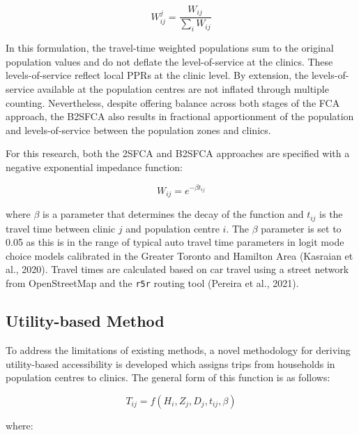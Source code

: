 \documentclass[]{elsarticle} %
\begin{document}
\begin{equation}
\label{eq:bfca_W_ij_j}
W_{ij}^{j} = \frac{W_{ij}}{\sum_i W_{ij}}
\end{equation}

In this formulation, the travel-time weighted populations sum to the
original population values and do not deflate the level-of-service at
the clinics. These levels-of-service reflect local PPRs at the clinic
level. By extension, the levels-of-service available at the population
centres are not inflated through multiple counting. Nevertheless,
despite offering balance across both stages of the FCA approach, the
B2SFCA also results in fractional apportionment of the population and
levels-of-service between the population zones and clinics.

For this research, both the 2SFCA and B2SFCA approaches are specified
with a negative exponential impedance function:

\begin{equation}
\label{eq:W_ij}
W_{ij} = e^{-\beta t_{ij}}
\end{equation}

\noindent where \(\beta\) is a parameter that determines the decay of
the function and \(t_{ij}\) is the travel time between clinic \(j\) and
population centre \(i\). The \(\beta\) parameter is set to 0.05 as this
is in the range of typical auto travel time parameters in logit mode
choice models calibrated in the Greater Toronto and Hamilton Area
(Kasraian et al., 2020). Travel times are calculated based on car travel
using a street network from OpenStreetMap and the \texttt{r5r} routing
tool (Pereira et al., 2021).

\hypertarget{utility-based-method}{%
\subsection{Utility-based Method}\label{utility-based-method}}

To address the limitations of existing methods, a novel methodology for
deriving utility-based accessibility is developed which assigns trips
from households in population centres to clinics. The general form of
this function is as follows:

\begin{equation}
\label{eq:mnl_T_ij}
T_{ij} = f(H_i, Z_j, D_j, t_{ij}, \beta)
\end{equation}

\noindent where:
\end{document}
